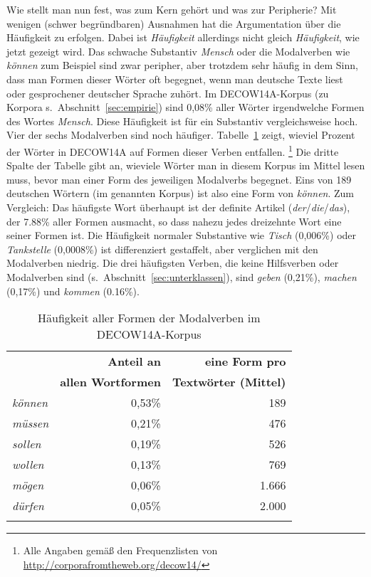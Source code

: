 Wie stellt man nun fest, was zum Kern gehört und was zur Peripherie?
Mit wenigen (schwer begründbaren) Ausnahmen hat die Argumentation über die Häufigkeit zu erfolgen.
Dabei ist \textit{Häufigkeit} allerdings nicht gleich \textit{Häufigkeit}, wie jetzt gezeigt wird.
Das schwache Substantiv \textit{Mensch} oder die Modalverben wie \textit{können} zum Beispiel sind zwar peripher, aber trotzdem sehr häufig in dem Sinn, dass man Formen dieser Wörter oft begegnet, wenn man deutsche Texte liest oder gesprochener deutscher Sprache zuhört.
Im DECOW14A-Korpus (zu Korpora s.\ Abschnitt~\ref{sec:empirie}) sind 0,08\% aller Wörter irgendwelche Formen des Wortes \textit{Mensch}.
Diese Häufigkeit ist für ein Substantiv vergleichsweise hoch.
Vier der sechs Modalverben sind noch häufiger.
Tabelle~\ref{tab:kernundperipherie032} zeigt, wieviel Prozent der Wörter in DECOW14A auf Formen dieser Verben entfallen.%
\footnote{Alle Angaben gemäß den Frequenzlisten von \url{http://corporafromtheweb.org/decow14/}}
Die dritte Spalte der Tabelle gibt an, wieviele Wörter man in diesem Korpus im Mittel lesen muss, bevor man einer Form des jeweiligen Modalverbs begegnet.
Eins von 189 deutschen Wörtern (im genannten Korpus) ist also eine Form von \textit{können}.
Zum Vergleich: Das häufigste Wort überhaupt ist der definite Artikel (\textit{der}\slash\textit{die}\slash\textit{das}), der 7.88\% aller Formen ausmacht, so dass nahezu jedes dreizehnte Wort eine seiner Formen ist.
Die Häufigkeit normaler Substantive wie \textit{Tisch} (0,006\%) oder \textit{Tankstelle} (0,0008\%) ist differenziert gestaffelt, aber verglichen mit den Modalverben niedrig.
Die drei häufigsten Verben, die keine Hilfsverben oder Modalverben sind (s.\ Abschnitt~\ref{sec:unterklassen}), sind \textit{geben} (0,21\%), \textit{machen} (0,17\%) und \textit{kommen} (0.16\%).

\begin{table}[!htbp]
  \begin{tabular}{lrr}
    \lsptoprule
    \multirow{2}{*}{\textbf{Modalverb}} & \textbf{Anteil an} & \textbf{eine Form pro}\\
    & \textbf{allen Wortformen} & \textbf{Textwörter (Mittel)}\\
    \midrule
    \textit{können} & 0,53\% &   189 \\
    \textit{müssen} & 0,21\% &   476 \\
    \textit{sollen} & 0,19\% &   526 \\
    \textit{wollen} & 0,13\% &   769 \\
    \textit{mögen}  & 0,06\% & 1.666\\
    \textit{dürfen} & 0,05\% & 2.000\\
    \lspbottomrule
  \end{tabular}
  \caption{Häufigkeit aller Formen der Modalverben im DECOW14A-Korpus}
  \label{tab:kernundperipherie032}
\end{table}

